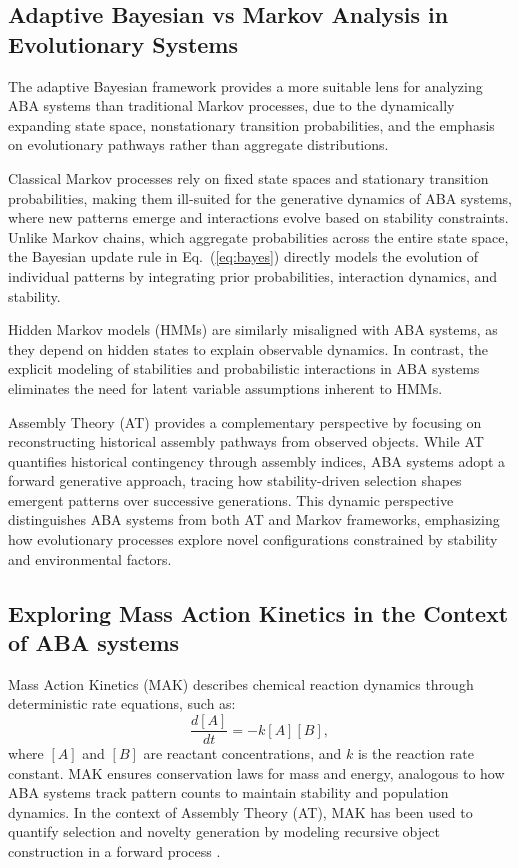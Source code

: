 \documentclass[entropy,article,submit,pdftex,oneauthor]{Definitions/mdpi}
\begin{document}
\subsection{Adaptive Bayesian vs Markov Analysis in Evolutionary Systems}

The adaptive Bayesian framework provides a more suitable lens for analyzing ABA systems than traditional Markov processes, due to the dynamically expanding state space, nonstationary transition probabilities, and the emphasis on evolutionary pathways rather than aggregate distributions. 

Classical Markov processes \cite{norris1997markov} rely on fixed state spaces and stationary transition probabilities, making them ill-suited for the generative dynamics of ABA systems, where new patterns emerge and interactions evolve based on stability constraints. Unlike Markov chains, which aggregate probabilities across the entire state space, the Bayesian update rule in Eq.~(\ref{eq:bayes}) directly models the evolution of individual patterns by integrating prior probabilities, interaction dynamics, and stability.

Hidden Markov models (HMMs) \cite{rabiner1989hmm} are similarly misaligned with ABA systems, as they depend on hidden states to explain observable dynamics. In contrast, the explicit modeling of stabilities and probabilistic interactions in ABA systems eliminates the need for latent variable assumptions inherent to HMMs.

Assembly Theory (AT) provides a complementary perspective by focusing on reconstructing historical assembly pathways from observed objects. While AT quantifies historical contingency through assembly indices, ABA systems adopt a forward generative approach, tracing how stability-driven selection shapes emergent patterns over successive generations. This dynamic perspective distinguishes ABA systems from both AT and Markov frameworks, emphasizing how evolutionary processes explore novel configurations constrained by stability and environmental factors.

\subsection{Exploring Mass Action Kinetics in the Context of ABA systems}

Mass Action Kinetics (MAK) \cite{TuranyiTomlin2014} describes chemical reaction dynamics through deterministic rate equations, such as:
\begin{equation}
\frac{d[A]}{dt} = -k[A][B],
\end{equation}
where \( [A] \) and \( [B] \) are reactant concentrations, and \( k \) is the reaction rate constant. MAK ensures conservation laws for mass and energy, analogous to how ABA systems track pattern counts to maintain stability and population dynamics. In the context of Assembly Theory (AT), MAK has been used to quantify selection and novelty generation by modeling recursive object construction in a forward process \cite{walker2023nature}.
\end{document}
